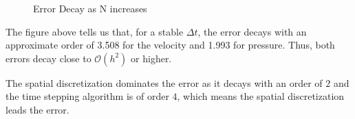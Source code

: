 \begin{questions}
\begin{solution}

\begin{figure}[H]
\caption{Error Decay as N increases}
\end{figure}

The figure above tells us that, for a stable $\Delta t$, the error decays with an approximate order of 3.508 for the velocity and 1.993 for pressure. Thus, both errors decay close to $\mathcal{O}(h^2)$ or higher.

The spatial discretization dominates the error as it decays with an order of $2$ and the time stepping algorithm is of order $4$, which means the spatial discretization leads the error.
\end{solution}



\begin{solution}


\end{solution}

\end{questions}